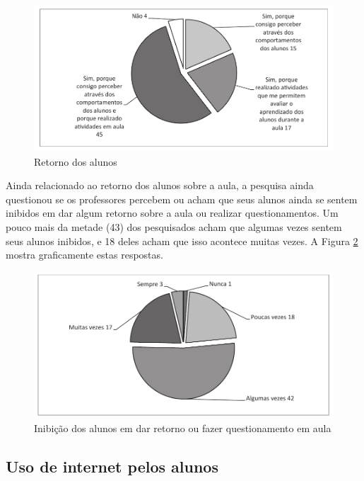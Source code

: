 \begin{figure}[!h]
\centering
\includegraphics[width=1.0\textwidth]{pdfs/professores/img-grafico-retorno.pdf} 
\caption{Retorno dos alunos}
\label{fig:grafico_retorno} 
\end{figure}

Ainda relacionado ao retorno dos alunos sobre a aula, a pesquisa ainda questionou se os professores percebem ou acham que seus alunos ainda se sentem inibidos em dar algum retorno sobre a aula ou realizar questionamentos. Um pouco mais da metade (43) dos pesquisados acham que algumas vezes sentem seus alunos inibidos, e 18 deles acham que isso acontece muitas vezes. A Figura \ref{fig:grafico_inibicao} mostra graficamente estas respostas.

\begin{figure}[!h]
\centering
\includegraphics[width=1.0\textwidth]{pdfs/professores/img-grafico-inibicao.pdf} 
\caption{Inibição dos alunos em dar retorno ou fazer questionamento em aula }
\label{fig:grafico_inibicao} 
\end{figure}


\subsection{Uso de internet pelos alunos}


